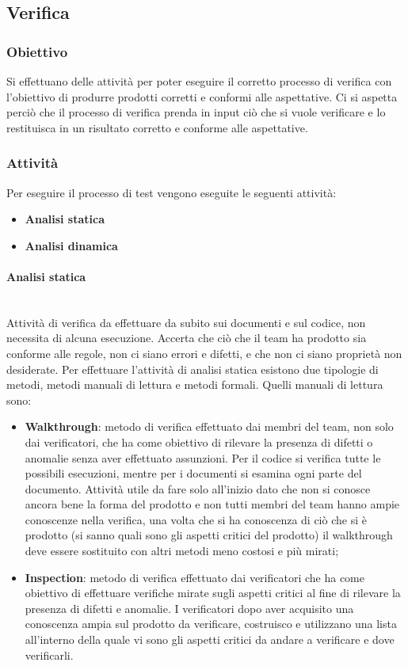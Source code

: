 \subsection{Verifica}
\subsubsection{Obiettivo}
Si effettuano delle attività per poter eseguire il corretto processo di verifica con l’obiettivo di produrre prodotti corretti e conformi alle aspettative. Ci si aspetta perciò che il processo di verifica prenda in input ciò che si vuole verificare e lo restituisca in un risultato corretto e conforme alle aspettative.

\subsubsection{Attività}
Per eseguire il processo di test vengono eseguite le seguenti attività:
\begin{itemize} 
\item \textbf{Analisi statica}
\item \textbf{Analisi dinamica}
\end{itemize}

\paragraph{Analisi statica} \mbox{}\\
Attività di verifica da effettuare da subito sui documenti e sul codice, non necessita di alcuna esecuzione. Accerta che ciò che il team ha prodotto sia conforme alle regole, non ci siano errori e difetti, e che non ci siano proprietà non desiderate.  Per effettuare l’attività di analisi statica esistono due tipologie di metodi, metodi manuali di lettura e metodi formali. 
Quelli manuali di lettura sono:
\begin{itemize} 
\item \textbf{Walkthrough}: metodo di verifica effettuato dai membri del team, non solo dai verificatori, che ha come obiettivo di rilevare la presenza di difetti o anomalie senza aver effettuato assunzioni. Per il codice si verifica tutte le possibili esecuzioni, mentre per i documenti si esamina ogni parte del documento. Attività utile da fare solo all’inizio dato che non si conosce ancora bene la forma del prodotto e non tutti membri del team hanno ampie conoscenze nella verifica, una volta che si ha conoscenza di ciò che si è prodotto (si sanno quali sono gli aspetti critici del prodotto) il walkthrough deve essere sostituito con altri metodi meno costosi e più mirati;
\item \textbf{Inspection}: metodo di verifica effettuato dai verificatori che ha come obiettivo di effettuare verifiche mirate sugli aspetti critici al fine di rilevare la presenza di difetti e anomalie. I verificatori dopo aver acquisito una conoscenza ampia sul prodotto da verificare, costruisco e utilizzano una lista all’interno della quale vi sono gli aspetti critici da andare a verificare e dove verificarli.
\end{itemize}
